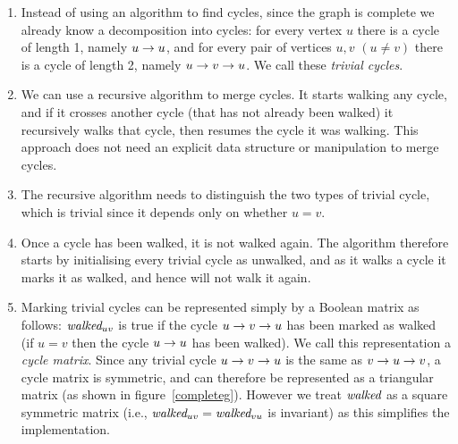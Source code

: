 \documentclass[prodmode,acmtecs]{acmsmall} %
\begin{document}
\begin{enumerate}\raggedright
\item
Instead of using an algorithm to find cycles, since the graph is complete we already know a decomposition into cycles: for every vertex $u$ there is a cycle of length 1, namely $\pair uu$, and for every pair of vertices $u,v$ $(u \neq v)$ there is a cycle of length 2, namely $\pair uv$.  We call these \emph{trivial cycles}.

\item
We can use a recursive algorithm to merge cycles. It starts walking any cycle, and if it crosses another cycle (that has not already been walked) it recursively walks that cycle, then resumes the cycle it was walking. This approach does not need an explicit data structure or manipulation to merge cycles.

\item
The recursive algorithm needs to distinguish the two types of trivial cycle, which is trivial since it depends only on whether $u=v$.

\item
Once a cycle has been walked, it is not walked again. The algorithm therefore starts by initialising every trivial cycle as unwalked, and as it walks a cycle it marks it as walked, and hence will not walk it again.

\item
Marking trivial cycles can be represented simply by a Boolean matrix as follows: $\mbox{\it walked}_{uv}$ is true if the cycle $\pair uv$ has been marked as walked (if $u=v$ then the cycle $\pair uu$ has been walked). We call this representation a \emph{cycle matrix}. Since any trivial cycle $\pair uv$ is the same as $\pair vu$, a cycle matrix is symmetric, and can therefore be represented as a triangular matrix (as shown in figure~\ref{completeg}). However we treat $\mbox{\it walked}$ as a square symmetric matrix (i.e., $\mbox{\it walked}_{uv}=\mbox{\it walked}_{vu}$ is invariant) as this simplifies the implementation.
\end{enumerate}
\end{document}
